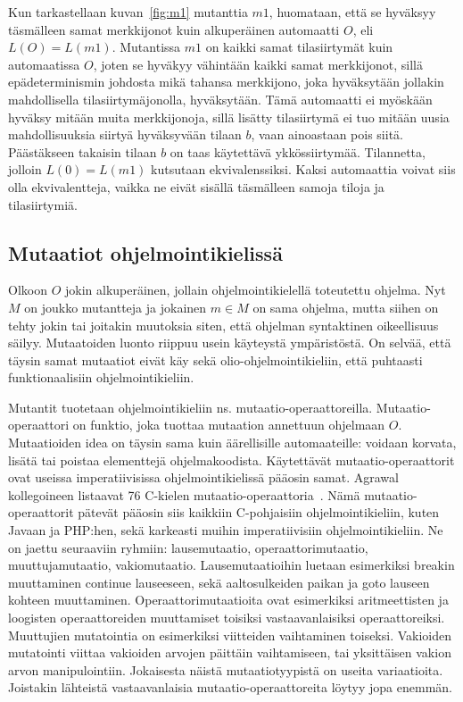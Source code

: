 \documentclass[finnish]{tktltiki2}
\begin{document}
Kun tarkastellaan kuvan~\ref{fig:m1} mutanttia $m1$, huomataan, että se hyväksyy täsmälleen samat merkkijonot kuin alkuperäinen automaatti $O$, eli $L(O) = L(m1)$. Mutantissa $m1$ on kaikki samat tilasiirtymät kuin automaatissa $O$, joten se hyväkyy vähintään kaikki samat merkkijonot, sillä epädeterminismin johdosta mikä tahansa merkkijono, joka hyväksytään jollakin mahdollisella tilasiirtymäjonolla, hyväksytään. Tämä automaatti ei myöskään hyväksy mitään muita merkkijonoja, sillä lisätty tilasiirtymä ei tuo mitään uusia mahdollisuuksia siirtyä hyväksyvään tilaan $b$, vaan ainoastaan pois siitä. Päästäkseen takaisin tilaan $b$ on taas käytettävä ykkössiirtymää. Tilannetta, jolloin $L(0) = L(m1)$ kutsutaan ekvivalenssiksi. Kaksi automaattia voivat siis olla ekvivalentteja, vaikka ne eivät sisällä täsmälleen samoja tiloja ja tilasiirtymiä.
 
\subsection{Mutaatiot ohjelmointikielissä}
Olkoon $O$ jokin alkuperäinen, jollain ohjelmointikielellä toteutettu ohjelma. Nyt $M$ on joukko mutantteja ja jokainen $m\in M$ on sama ohjelma, mutta siihen on tehty jokin tai joitakin muutoksia siten, että ohjelman syntaktinen oikeellisuus säilyy. Mutaatoiden luonto riippuu usein käyteystä ympäristöstä. On selvää, että täysin samat mutaatiot eivät käy sekä olio-ohjelmointikieliin, että puhtaasti funktionaalisiin ohjelmointikieliin.

Mutantit tuotetaan ohjelmointikieliin ns. mu\-taa\-tio\--ope\-raat\-to\-reil\-la. Mu\-taa\-tio\--ope\-raatto\-ri on funktio, joka tuottaa mutaation annettuun ohjelmaan $O$. Mutaatioiden idea on täysin sama kuin äärellisille automaateille: voidaan korvata, lisätä tai poistaa elementtejä ohjelmakoodista. Käytettävät mutaatio-operaattorit ovat useissa imperatiivisissa ohjelmointikielissä pääosin samat. Agrawal kollegoineen listaavat 76 C-kielen mu\-taa\-tio\--ope\-raatto\-ria~\cite{AgrawalDHHHKMMS89}. Nämä mutaatio-operaattorit pätevät pääosin siis kaikkiin C-pohjaisiin ohjelmointikieliin, kuten Javaan ja PHP:hen, sekä karkeasti muihin imperatiivisiin ohjelmointikieliin. Ne on jaettu seuraaviin ryhmiin: lausemutaatio, operaattorimutaatio, muuttujamutaatio, vakiomutaatio. Lausemutaatioihin luetaan esimerkiksi breakin muuttaminen continue lauseeseen, sekä aaltosulkeiden paikan ja goto lauseen kohteen muuttaminen. Operaattorimutaatioita ovat esimerkiksi aritmeettisten ja loogisten operaattoreiden muuttamiset toisiksi vastaavanlaisiksi operaattoreiksi. Muuttujien mutatointia on esimerkiksi viitteiden vaihtaminen toiseksi. Vakioiden mutatointi viittaa vakioiden arvojen päittäin vaihtamiseen, tai yksittäisen vakion arvon manipulointiin. Jokaisesta näistä mutaatiotyypistä on useita variaatioita. Joistakin lähteistä vastaavanlaisia mut\-aa\-tio\--operaattoreita löytyy jopa enemmän.
\end{document}
